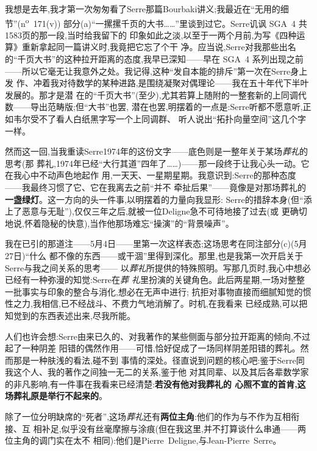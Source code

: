 \pmark{}我想是去年,我才第一次匆匆看了Serre那篇Bourbaki讲义;我最近在“无用的细节”(n\textsuperscript{o}~171(v))
部分(a)“一摞摞千页的大书……”里谈到过它。Serre讥讽 SGA~4 共1583页的那一段,当时给我留下的
印象如此之淡,以至于一两个月前,为写《四种运算》重新拿起同一篇讲义时,我竟把它忘了个干
净。应当说,Serre对我那些出名的“千页大书”的这种拉开距离的态度,我早已深知——早在 SGA~4
系列出现之前——所以它毫无让我意外之处。我记得,这种“发自本能的排斥”第一次在Serre身上发
作、冲着我对待数学的某种进路,是围绕凝聚对偶理论——我在五十年代下半叶发展的。那才是潜
在的“千页大书”(至少),尤其若算上随附的一整套新的上同调代数——导出范畴版;但“大书”也罢,
潜在也罢,明摆着的一点是:Serre听都不愿意听,正如韦尔受不了看人白纸黑字写一个上同调群、
听人说出“拓扑向量空间”这几个字一样。

\pmark 然而这一回,当我重读Serre1974年的这份文字——底色则是一整年关于某场\emph{葬礼}的思考(那
葬礼,1974年已经“大行其道”四年了……)——那一段终于让我心头一动。它在我心中不动声色地起作
用,一天天、一星期星期。我意识到:Serre的那种态度——我最终习惯了它、它在我离去之前“并不
牵扯后果”——竟像是对那场葬礼的\textbf{一盏绿灯}。这一方向的头一件事,以明摆着的力量向我显形:
Serre的措辞本身(但“添上了恶意与无耻”),仅仅三年之后,就被一位Deligne急不可待地接了过去(或
更确切地说,怀着隐秘的快意),当作他那场难忘“操演”的“背景噪声”。

我在已引的那道注——5月4日——里第一次这样表态;这场思考在同注部分(c)(5月27日)“什么
都不像的东西——或干涸”里得到深化。那里,也是我第一次开启关于Serre与我之间关系的思考——\dmark{}
以\emph{葬礼}所提供的特殊照明。写那几页时,我心中想必已经有一种弥漫的知觉:Serre在\emph{葬
礼}里扮演的关键角色。此后两星期,一场对整整一批事实与印象的整合与消化,想必在无声中进行;
抗拒对事物直接而细腻知觉的惯性之力,我相信,已不经战斗、不费力气地消解了。时机,在我看来
已经成熟,可以把知觉到的东西表述出来,尽我所能。

人们也许会想:Serre由来已久的、对我著作的某些侧面与部分拉开距离的倾向,不过起了一种阴差
阳错的偶然作用——可惜,恰好促成了一场同样阴差阳错的葬礼。然而那是一种肤浅的看法,碰不到
事情的深处。径直说到问题的核心吧:鉴于Serre同我这个人、我的著作之间独一无二的关系,鉴于他
对其同辈、以及其后各辈数学家的非凡影响,有一件事在我看来已经清楚:\textbf{若没有他对我葬礼的
心照不宣的首肯,这场葬礼原是举行不起来的}。

除了一位分明缺席的“死者”,这场\emph{葬礼}还有\textbf{两位主角}:他们的作为与不作为互相衔接、互
相补足,似乎没有丝毫摩擦与涂痕(但在我这里,并不打算谈什么串通——两位主角的调门实在太不
相同):他们是Pierre~Deligne,与Jean-Pierre~Serre。


